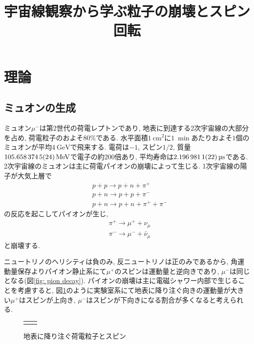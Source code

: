 \documentclass[dvipdfmx]{jsarticle}
\title{宇宙線観察から学ぶ粒子の崩壊とスピン回転
}
\begin{document}
\maketitle

\section{理論}

\subsection{ミュオンの生成}
\label{sec: theory: generation of muon}

ミュオン$\mu^-$は第2世代の荷電レプトンであり, 地表に到達する2次宇宙線の大部分を占め, 荷電粒子のおよそ80\%である\cite{Grupen}.
水平面積$\SI{1}{\cm^2}$に$\SI{1}{\min}$あたりおよそ$1$個のミュオンが平均$\SI{4}{\GeV}$で飛来する\cite{PDG}.
電荷は$-1$, スピン$1/2$, 質量$\SI{105.6583745\pm0.0000024}{\MeV}$で電子の約200倍あり, 平均寿命は$\SI{2.1969811\pm0.0000022}{\micro\second}$である\cite{PDG}.
2次宇宙線のミュオンは主に荷電パイオンの崩壊によって生じる.
1次宇宙線の陽子が大気上層で
\begin{align*}
    &p+p\to p+n+\pi^+
    \\
    &p+n\to p+p+\pi^-
    \\
    &p+n\to p+n+\pi^++\pi^-
\end{align*}
の反応を起こしてパイオンが生じ,
\begin{align*}
    &\pi^+\to\mu^++\nu_\mu
    \\
    &\pi^-\to\mu^-+\bar{\nu}_\mu
\end{align*}
と崩壊する.

ニュートリノのヘリシティは負のみ, 反ニュートリノは正のみであるから, 角運動量保存よりパイオン静止系にて$\mu^+$のスピンは運動量と逆向きであり, $\mu^-$は同じとなる(図\ref{fig: pion decay}).
パイオンの崩壊は主に電磁シャワー内部で生じることを考慮すると, 図\ref{fig: muon shower}のように実験室系にて地表に降り注ぐ向きの運動量が大きい$\mu^+$はスピンが上向き, $\mu^-$はスピンが下向きになる割合が多くなると考えられる.

\begin{figure}
    \centering
    \begin{tabular}{cc}
        \begin{minipage}[t]{0.3\hsize}
            
            \caption{$\pi^+$の崩壊}
            \label{fig: pion decay}
        \end{minipage}
        &
        \begin{minipage}[t]{0.4\hsize}
            \centering
            
            \caption{地表に降り注ぐ荷電粒子とスピン}
            \label{fig: muon shower}
        \end{minipage}
    \end{tabular}
\end{figure}
\end{document}
